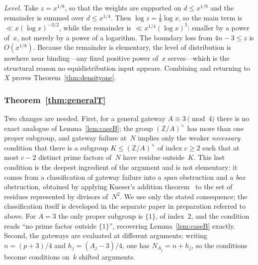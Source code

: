 \documentclass[12pt]{amsart}
\theoremstyle{definition}
\theoremstyle{remark}
\newcommand{\Z}{\mathbb{Z}}
\begin{document}
\emph{Level.}
Take $z = x^{1/8}$, so that the weights are supported on
$d \leq x^{1/8}$ and the remainder is summed over $d \leq x^{1/4}$.
Then $\log z = \tfrac{1}{8}\log x$, so the main term is
$\ll x(\log x)^{-3/2}$, while the remainder is $\ll x^{1/4}(\log x)^5$:
smaller by a power of~$x$, not merely by a power of a logarithm.
The boundary loss from $4n-3 \leq z$ is $O(x^{1/8})$.  Because the
remainder is elementary, the level of distribution is nowhere near
binding---any fixed positive power of~$x$ serves---which is the
structural reason no equidistribution input appears.  Combining and
returning to~$X$ proves Theorem~\ref{thm:densityone}.

\subsubsection*{Theorem~\ref{thm:generalT}}

Two changes are needed.  First, for a general gateway $A \equiv 3
\pmod 4$ there is no exact analogue of Lemma~\ref{lem:caseB}; the
group $(\Z/A)^\times$ has more than one proper subgroup, and gateway
failure at~$N$ implies only the weaker \emph{necessary} condition that
there is a subgroup $K \leq (\Z/A)^\times$ of index $c \geq 2$ such
that at most $c - 2$ distinct prime factors of~$N$ have residue
outside~$K$.
This last condition is the deepest ingredient of the argument and is
not elementary: it comes from a classification of gateway failure into
a \emph{span} obstruction and a \emph{box} obstruction, obtained by
applying Kneser's addition theorem~\cite{Kneser1953} to the set of
residues represented by divisors of~$N^2$.  We use only the stated
consequence; the classification itself is developed in the separate
paper in preparation referred to above.
For $A = 3$ the only proper subgroup is
$\{1\}$, of index~$2$, and the condition reads ``no prime factor
outside $\{1\}$'', recovering Lemma~\ref{lem:caseB} exactly.
Second, the gateways are evaluated at different arguments;
writing $n = (p+3)/4$ and $h_j = (A_j-3)/4$, one has
$N_{A_j} = n + h_j$, so the conditions become conditions on~$k$ shifted
arguments.
\end{document}
